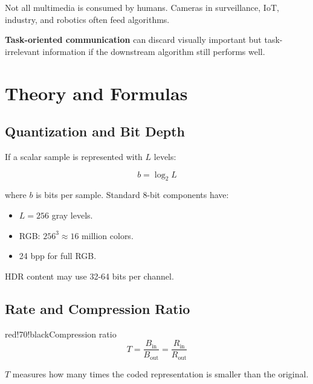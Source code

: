 Not all multimedia is consumed by humans. Cameras in surveillance, IoT, industry, and robotics often feed algorithms.

\begin{center}
\end{center}

\textbf{Task-oriented communication} can discard visually important but task-irrelevant information if the downstream algorithm still performs well.

\section{Theory and Formulas}

\subsection{Quantization and Bit Depth}

If a scalar sample is represented with $L$ levels:

\[
b = \log_2 L
\]

where $b$ is bits per sample. Standard 8-bit components have:

\begin{itemize}
  \item $L=256$ gray levels.
  \item RGB: $256^3 \approx 16$ million colors.
  \item 24 bpp for full RGB.
\end{itemize}

HDR content may use 32-64 bits per channel.

\subsection{Rate and Compression Ratio}

\begin{calloutbox}{red!70!black}{Compression ratio}
\[
T = \frac{B_{\text{in}}}{B_{\text{out}}}
  = \frac{R_{\text{in}}}{R_{\text{out}}}
\]

$T$ measures how many times the coded representation is smaller than the original.
\end{calloutbox}

